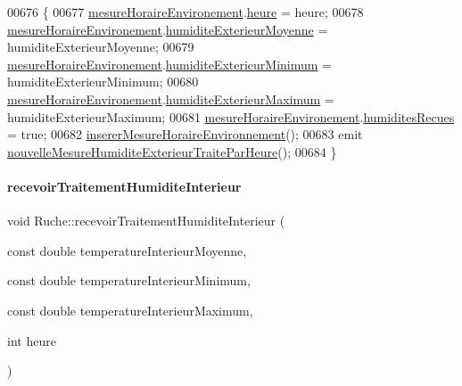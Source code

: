 \begin{DoxyCode}
00676 \{
00677     \hyperlink{class_ruche_a73a826506110c10d9221065670985e52}{mesureHoraireEnvironement}.\hyperlink{struct_mesure_horaire_environement_a83295c95940d9edae2d082a94f49e1c9}{heure} = heure;
00678     \hyperlink{class_ruche_a73a826506110c10d9221065670985e52}{mesureHoraireEnvironement}.\hyperlink{struct_mesure_horaire_environement_a25909e0885ee3588c637b738ced303d7}{humiditeExterieurMoyenne} = 
      humiditeExterieurMoyenne;
00679     \hyperlink{class_ruche_a73a826506110c10d9221065670985e52}{mesureHoraireEnvironement}.\hyperlink{struct_mesure_horaire_environement_a1621bd692dc352708d1931a48df9a596}{humiditeExterieurMinimum} = 
      humiditeExterieurMinimum;
00680     \hyperlink{class_ruche_a73a826506110c10d9221065670985e52}{mesureHoraireEnvironement}.\hyperlink{struct_mesure_horaire_environement_abb2c00c4262837d9e1122573283d86ec}{humiditeExterieurMaximum} = 
      humiditeExterieurMaximum;
00681     \hyperlink{class_ruche_a73a826506110c10d9221065670985e52}{mesureHoraireEnvironement}.\hyperlink{struct_mesure_horaire_environement_a4348771984d70b9ea7867dba511db336}{humiditesRecues} = \textcolor{keyword}{true};
00682     \hyperlink{class_ruche_ac52e79446c5629645e02e27d2a01e56c}{insererMesureHoraireEnvironnement}();
00683     emit \hyperlink{class_ruche_aab1ad40a46ab5fe4352a23e4a986856b}{nouvelleMesureHumiditeExterieurTraiteParHeure}();
00684 \}
\end{DoxyCode}
\mbox{\label{class_ruche_a6d4c59f2850f803a0ed1946e737b4262}} 
\paragraph{\texorpdfstring{recevoir\+Traitement\+Humidite\+Interieur}{recevoirTraitementHumiditeInterieur}}
{\footnotesize\ttfamily void Ruche\+::recevoir\+Traitement\+Humidite\+Interieur (\begin{DoxyParamCaption}\item[{const double}]{temperature\+Interieur\+Moyenne,  }\item[{const double}]{temperature\+Interieur\+Minimum,  }\item[{const double}]{temperature\+Interieur\+Maximum,  }\item[{int}]{heure }\end{DoxyParamCaption})\hspace{0.3cm}{\ttfamily [slot]}}



